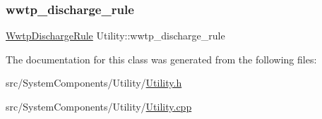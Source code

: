 \mbox{\label{classUtility_a0c598532230472e8106f6a71f97ea62d_a0c598532230472e8106f6a71f97ea62d}} 
\subsubsection{\texorpdfstring{wwtp\+\_\+discharge\+\_\+rule}{wwtp\_discharge\_rule}}
{\footnotesize\ttfamily \mbox{\hyperlink{classWwtpDischargeRule}{Wwtp\+Discharge\+Rule}} Utility\+::wwtp\+\_\+discharge\+\_\+rule\hspace{0.3cm}{\ttfamily [private]}}



The documentation for this class was generated from the following files\+:\begin{DoxyCompactItemize}
\item 
src/\+System\+Components/\+Utility/\mbox{\hyperlink{Utility_8h}{Utility.\+h}}\item 
src/\+System\+Components/\+Utility/\mbox{\hyperlink{Utility_8cpp}{Utility.\+cpp}}\end{DoxyCompactItemize}
